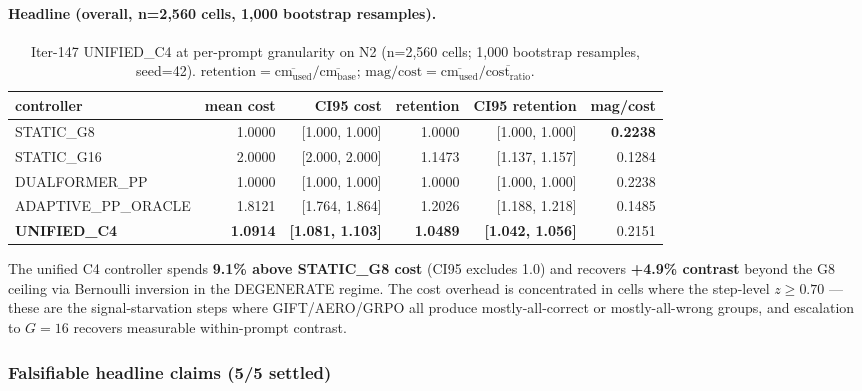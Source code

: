 \documentclass{article}
\begin{document}
\paragraph{Headline (overall, n=2,560 cells, 1,000 bootstrap resamples).}

\begin{table}[h]
\centering
\small
\caption{Iter-147 UNIFIED\_C4 at per-prompt granularity on N2 (n=2,560 cells; 1,000 bootstrap resamples, seed=42).
$\mathrm{retention} = \overline{\mathrm{cm}_{\mathrm{used}}}/\overline{\mathrm{cm}_{\mathrm{base}}}$;
$\mathrm{mag/cost} = \overline{\mathrm{cm}_{\mathrm{used}}}/\overline{\mathrm{cost}_{\mathrm{ratio}}}$.
}
\label{tab:p7-iter147-headline}
\begin{tabular}{lrrrrr}
\toprule
controller & mean cost & CI95 cost & retention & CI95 retention & mag/cost \\
\midrule
STATIC\_G8          & 1.0000 & [1.000, 1.000] & 1.0000  & [1.000, 1.000] & \textbf{0.2238} \\
STATIC\_G16         & 2.0000 & [2.000, 2.000] & 1.1473  & [1.137, 1.157] & 0.1284 \\
DUALFORMER\_PP      & 1.0000 & [1.000, 1.000] & 1.0000  & [1.000, 1.000] & 0.2238 \\
ADAPTIVE\_PP\_ORACLE& 1.8121 & [1.764, 1.864] & 1.2026  & [1.188, 1.218] & 0.1485 \\
\textbf{UNIFIED\_C4}& \textbf{1.0914} & \textbf{[1.081, 1.103]} & \textbf{1.0489} & \textbf{[1.042, 1.056]} & 0.2151 \\
\bottomrule
\end{tabular}
\end{table}

The unified C4 controller spends \textbf{9.1\% above STATIC\_G8 cost} (CI95 excludes 1.0)
and recovers \textbf{+4.9\% contrast} beyond the G8 ceiling via Bernoulli inversion in
the DEGENERATE regime. The cost overhead is concentrated in cells where the
step-level $z \geq 0.70$ --- these are the signal-starvation steps where GIFT/AERO/GRPO
all produce mostly-all-correct or mostly-all-wrong groups, and escalation to
$G{=}16$ recovers measurable within-prompt contrast.

\subsubsection*{Falsifiable headline claims (5/5 settled)}
\end{document}
